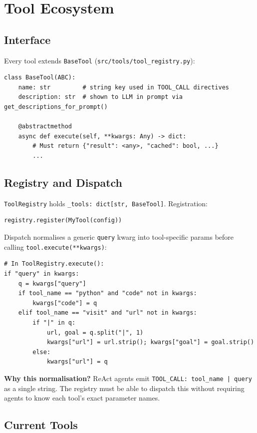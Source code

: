 \documentclass[11pt,a4paper]{article}
\begin{document}
\section{Tool Ecosystem}
\label{sec:tools}

\subsection{Interface}

Every tool extends \texttt{BaseTool} (\texttt{src/tools/tool\_registry.py}):

\begin{lstlisting}[style=py]
class BaseTool(ABC):
    name: str         # string key used in TOOL_CALL directives
    description: str  # shown to LLM in prompt via get_descriptions_for_prompt()

    @abstractmethod
    async def execute(self, **kwargs: Any) -> dict:
        # Must return {"result": <any>, "cached": bool, ...}
        ...
\end{lstlisting}

\subsection{Registry and Dispatch}

\texttt{ToolRegistry} holds \texttt{\_tools: dict[str, BaseTool]}. Registration:
\begin{lstlisting}[style=py]
registry.register(MyTool(config))
\end{lstlisting}

Dispatch normalises a generic \texttt{query} kwarg into tool-specific params before calling \texttt{tool.execute(**kwargs)}:
\begin{lstlisting}[style=py]
# In ToolRegistry.execute():
if "query" in kwargs:
    q = kwargs["query"]
    if tool_name == "python" and "code" not in kwargs:
        kwargs["code"] = q
    elif tool_name == "visit" and "url" not in kwargs:
        if "|" in q:
            url, goal = q.split("|", 1)
            kwargs["url"] = url.strip(); kwargs["goal"] = goal.strip()
        else:
            kwargs["url"] = q
\end{lstlisting}

\textbf{Why this normalisation?} ReAct agents emit \texttt{TOOL\_CALL: tool\_name | query} as a single string. The registry must be able to dispatch this without requiring agents to know each tool's exact parameter names.

\subsection{Current Tools}
\end{document}

